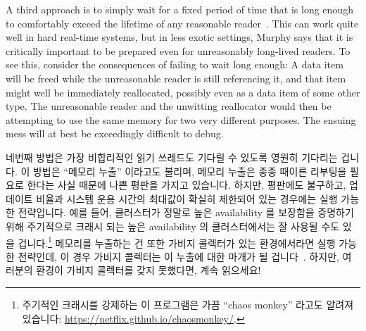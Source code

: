 A third approach is to simply wait for a fixed period of time that is
long enough to comfortably exceed the lifetime of any reasonable
reader~\cite{Jacobson93,AjuJohn95}.
This can work quite well in hard real-time systems, but in less exotic
settings, Murphy says that it is critically important to be prepared
even for unreasonably long-lived readers.
To see this, consider the consequences of failing to wait long enough:
A data item will be freed while the unreasonable reader is still
referencing it, and that item might well be immediately reallocated,
possibly even as a data item of some other type.
The unreasonable reader and the unwitting reallocator would then
be attempting to use the same memory for two very different purposes.
The ensuing mess will at best be exceedingly difficult to debug.
\fi

네번째 방법은 가장 비합리적인 읽기 쓰레드도 기다릴 수 있도록 영원히 기다리는
겁니다.
이 방법은 ``메모리 누출'' 이라고도 불리며, 메모리 누출은 종종 때이른 리부팅을
필요로 한다는 사실 때문에 나쁜 평판을 가지고 있습니다.
하지만, 평판에도 불구하고, 업데이트 비율과 시스템 운용 시간의 최대값이 확실히
제한되어 있는 경우에는 실행 가능한 전략입니다.
예를 들어, 클러스터가 정말로 높은 availability 를 보장함을 증명하기 위해
주기적으로 크래시 되는 높은 availability 의 클러스터에서는 잘 사용될 수도 있을
겁니다.\footnote{
	주기적인 크래시를 강제하는 이 프로그램은 가끔 ``chaos monkey'' 라고도
	알려져 있습니다:
	\url{https://netflix.github.io/chaosmonkey/}.}
메모리를 누출하는 건 또한 가비지 콜렉터가 있는 환경에서라면 실행 가능한
전략인데, 이 경우 가비지 콜렉터는 이 누출에 대한 마개가 될
겁니다~\cite{Kung80}.
하지만, 여러분의 환경이 가비지 콜렉터를 갖지 못했다면, 계속 읽으세요!

